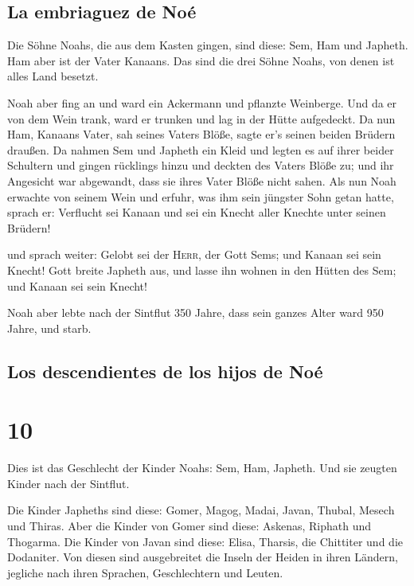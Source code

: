 \hypertarget{la-embriaguez-de-nouxe9}{%
\subsection{La embriaguez de Noé}\label{la-embriaguez-de-nouxe9}}

 Die Söhne Noahs, die aus dem Kasten gingen, sind diese:
Sem, Ham und Japheth. Ham aber ist der Vater Kanaans. 
Das sind die drei Söhne Noahs, von denen ist alles Land besetzt.

 Noah aber fing an und ward ein Ackermann und pflanzte
Weinberge.  Und da er von dem Wein trank, ward er trunken
und lag in der Hütte aufgedeckt.  Da nun Ham, Kanaans
Vater, sah seines Vaters Blöße, sagte er's seinen beiden Brüdern
draußen.  Da nahmen Sem und Japheth ein Kleid und legten
es auf ihrer beider Schultern und gingen rücklings hinzu und deckten des
Vaters Blöße zu; und ihr Angesicht war abgewandt, dass sie ihres Vater
Blöße nicht sahen.  Als nun Noah erwachte von seinem Wein
und erfuhr, was ihm sein jüngster Sohn getan hatte, 
sprach er: Verflucht sei Kanaan und sei ein Knecht aller Knechte unter
seinen Brüdern!

 und sprach weiter: Gelobt sei der \textsc{Herr}, der
Gott Sems; und Kanaan sei sein Knecht!  Gott breite
Japheth aus, und lasse ihn wohnen in den Hütten des Sem; und Kanaan sei
sein Knecht!

 Noah aber lebte nach der Sintflut 350 Jahre,
 dass sein ganzes Alter ward 950 Jahre, und starb.

\hypertarget{los-descendientes-de-los-hijos-de-nouxe9}{%
\subsection{Los descendientes de los hijos de
Noé}\label{los-descendientes-de-los-hijos-de-nouxe9}}

\hypertarget{section-9}{%
\section{10}\label{section-9}}

 Dies ist das Geschlecht der Kinder Noahs: Sem, Ham,
Japheth. Und sie zeugten Kinder nach der Sintflut.

 Die Kinder Japheths sind diese: Gomer, Magog, Madai,
Javan, Thubal, Mesech und Thiras.  Aber die Kinder von
Gomer sind diese: Askenas, Riphath und Thogarma.  Die
Kinder von Javan sind diese: Elisa, Tharsis, die Chittiter und die
Dodaniter.  Von diesen sind ausgebreitet die Inseln der
Heiden in ihren Ländern, jegliche nach ihren Sprachen, Geschlechtern und
Leuten.

